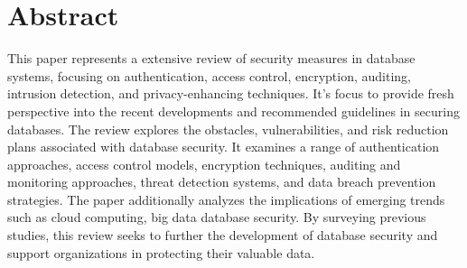 \documentclass[12pt]{book} %
\begin{document}







{}












\setcounter{page}{1}




\section*{Abstract}

This paper represents a extensive review of security measures in database systems, focusing on authentication, access control, encryption, auditing, intrusion detection, and privacy-enhancing techniques. It's focus to provide fresh perspective into the recent developments and recommended guidelines in securing databases. The review  explores the obstacles, vulnerabilities, and risk reduction plans associated with 
database security. It examines a range of authentication approaches, access control models, encryption techniques, auditing and monitoring approaches, threat detection systems, and data breach prevention strategies. The paper additionally analyzes the implications of emerging trends such as cloud computing, big data database security. By surveying previous studies, this review seeks to further the development of database security and support organizations in protecting their valuable data.\cite{a_comprve_rev_of_sec_measr_in_db_sys_assess_auth_accss_ctrl_bynd} \label{sec:a_comprve_rev_of_sec_measr_in_db_sys_assess_auth_accss_ctrl_bynd_1}\\
\end{document}

